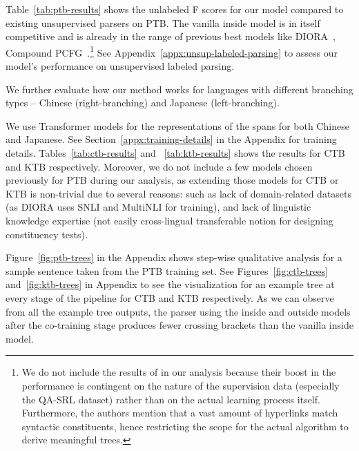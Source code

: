 \documentclass[11pt]{article}
\newcommand{\ptb}{\textsc{PTB}}
\newcommand{\ctb}{\textsc{CTB}}
\newcommand{\ktb}{\textsc{KTB}}
\newcommand{\ignore}[1]{}
\begin{document}
Table~\ref{tab:ptb-results} shows the unlabeled F scores for our model compared to existing unsupervised parsers on \ptb{}. The vanilla inside model is in itself competitive and is already in the range of previous best models like DIORA~\citep{drozdov-etal-2019-unsupervised}, Compound PCFG~\citep{kim-etal-2019-compound}.\footnote{We do not include the results of \citet{shi-etal-2021-learning} in our analysis because their boost in the performance is contingent on the nature of the supervision data (especially the QA-SRL dataset) rather than on the actual learning process itself. Furthermore, the authors mention that a vast amount of hyperlinks match syntactic constituents, hence restricting the scope for the actual algorithm to derive meaningful trees.} See Appendix~\ref{appx:unsup-labeled-parsing} to assess our model's performance on unsupervised labeled parsing.

We further evaluate how our method works for languages with different branching types -- Chinese (right-branching) and Japanese (left-branching).
\ignore{
The issue with multilingual \textsc{BERT} (\textsc{mBERT}; \citealp{devlin-etal-2019-bert}) as well as with \textsc{XLM-RoBERTa} \citep{conneau-etal-2020-unsupervised} is that those produce rather bad sentence representation out-of-the-box. Further, the vector spaces between languages are not aligned, i.e., the sentences with the same content in different languages would be mapped to different locations in the vector space. Given that we were more easily able to achieve good results with monolingual Transformer models, and knowing that it requires less memory (due to a smaller vocabulary), we decided to stick with it (see Section~\ref{appx:training-details} in Appendix for training details).
}
We use Transformer models for the representations of the spans for both Chinese and Japanese. See Section~\ref{appx:training-details} in the Appendix for training details. Tables~\ref{tab:ctb-results} and ~\ref{tab:ktb-results} shows the results for \ctb{} and \ktb{} respectively. Moreover, we do not include a few models chosen previously for \ptb{} during our analysis, as extending those models for \ctb{} or \ktb{} is non-trivial due to several reasons: such as lack of domain-related datasets (as {DIORA} uses SNLI and MultiNLI for training), and lack of linguistic knowledge expertise (not easily cross-lingual transferable notion for designing constituency tests).  


Figure~\ref{fig:ptb-trees} in the Appendix shows step-wise qualitative analysis for a sample sentence taken from the \ptb{} training set. See Figures~\ref{fig:ctb-trees} and~\ref{fig:ktb-trees} in Appendix to see the visualization for an example tree at every stage of the pipeline for \ctb{} and \ktb{} respectively. As we can observe from all the example tree outputs, the parser using the inside and outside models after the co-training stage produces fewer crossing brackets than the vanilla inside model.
\end{document}
